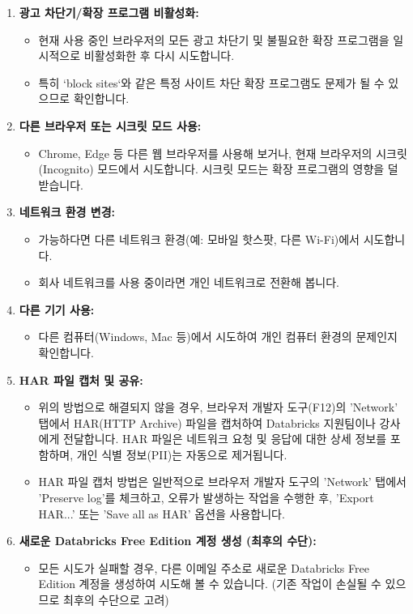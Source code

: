 \documentclass[11pt,a4paper]{article}
\begin{document}
\begin{tcolorbox}[examplebox={수정 방법}]
\begin{enumerate}
    \item \textbf{광고 차단기/확장 프로그램 비활성화:}
    \begin{itemize}
        \item 현재 사용 중인 브라우저의 모든 광고 차단기 및 불필요한 확장 프로그램을 일시적으로 비활성화한 후 다시 시도합니다.
        \item 특히 `block sites`와 같은 특정 사이트 차단 확장 프로그램도 문제가 될 수 있으므로 확인합니다.
    \end{itemize}
    \item \textbf{다른 브라우저 또는 시크릿 모드 사용:}
    \begin{itemize}
        \item Chrome, Edge 등 다른 웹 브라우저를 사용해 보거나, 현재 브라우저의 시크릿(Incognito) 모드에서 시도합니다. 시크릿 모드는 확장 프로그램의 영향을 덜 받습니다.
    \end{itemize}
    \item \textbf{네트워크 환경 변경:}
    \begin{itemize}
        \item 가능하다면 다른 네트워크 환경(예: 모바일 핫스팟, 다른 Wi-Fi)에서 시도합니다.
        \item 회사 네트워크를 사용 중이라면 개인 네트워크로 전환해 봅니다.
    \end{itemize}
    \item \textbf{다른 기기 사용:}
    \begin{itemize}
        \item 다른 컴퓨터(Windows, Mac 등)에서 시도하여 개인 컴퓨터 환경의 문제인지 확인합니다.
    \end{itemize}
    \item \textbf{HAR 파일 캡처 및 공유:}
    \begin{itemize}
        \item 위의 방법으로 해결되지 않을 경우, 브라우저 개발자 도구(F12)의 'Network' 탭에서 HAR(HTTP Archive) 파일을 캡처하여 Databricks 지원팀이나 강사에게 전달합니다. HAR 파일은 네트워크 요청 및 응답에 대한 상세 정보를 포함하며, 개인 식별 정보(PII)는 자동으로 제거됩니다.
        \item HAR 파일 캡처 방법은 일반적으로 브라우저 개발자 도구의 'Network' 탭에서 'Preserve log'를 체크하고, 오류가 발생하는 작업을 수행한 후, 'Export HAR...' 또는 'Save all as HAR' 옵션을 사용합니다.
    \end{itemize}
    \item \textbf{새로운 Databricks Free Edition 계정 생성 (최후의 수단):}
    \begin{itemize}
        \item 모든 시도가 실패할 경우, 다른 이메일 주소로 새로운 Databricks Free Edition 계정을 생성하여 시도해 볼 수 있습니다. (기존 작업이 손실될 수 있으므로 최후의 수단으로 고려)
    \end{itemize}
\end{enumerate}
\end{tcolorbox}
\end{document}
